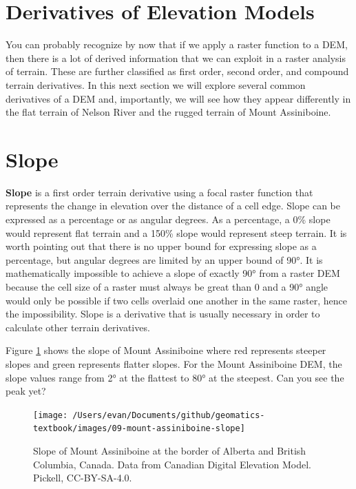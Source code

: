 \documentclass[
]{book}
\begin{document}
\hypertarget{derivatives-of-elevation-models}{%
\section{Derivatives of Elevation Models}\label{derivatives-of-elevation-models}}

You can probably recognize by now that if we apply a raster function to a DEM, then there is a lot of derived information that we can exploit in a raster analysis of terrain. These are further classified as first order, second order, and compound terrain derivatives. In this next section we will explore several common derivatives of a DEM and, importantly, we will see how they appear differently in the flat terrain of Nelson River and the rugged terrain of Mount Assiniboine.

\hypertarget{slope}{%
\section{Slope}\label{slope}}

\textbf{Slope} is a first order terrain derivative using a focal raster function that represents the change in elevation over the distance of a cell edge. Slope can be expressed as a percentage or as angular degrees. As a percentage, a 0\% slope would represent flat terrain and a 150\% slope would represent steep terrain. It is worth pointing out that there is no upper bound for expressing slope as a percentage, but angular degrees are limited by an upper bound of 90°. It is mathematically impossible to achieve a slope of exactly 90° from a raster DEM because the cell size of a raster must always be great than 0 and a 90° angle would only be possible if two cells overlaid one another in the same raster, hence the impossibility. Slope is a derivative that is usually necessary in order to calculate other terrain derivatives.

Figure \ref{fig:9-mount-assiniboine-slope} shows the slope of Mount Assiniboine where red represents steeper slopes and green represents flatter slopes. For the Mount Assiniboine DEM, the slope values range from 2° at the flattest to 80° at the steepest. Can you see the peak yet?

\begin{figure}
\texttt{[image: /Users/evan/Documents/github/geomatics-textbook/images/09-mount-assiniboine-slope]} \caption{Slope of Mount Assiniboine at the border of Alberta and British Columbia, Canada. Data from Canadian Digital Elevation Model. Pickell, CC-BY-SA-4.0.}\label{fig:9-mount-assiniboine-slope}
\end{figure}
\end{document}
